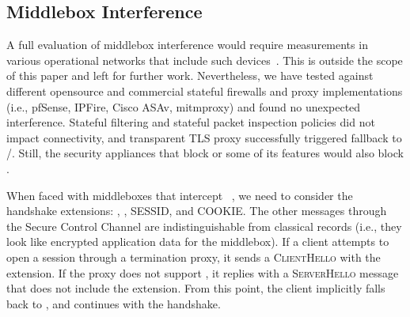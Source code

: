 

\subsection{Middlebox Interference}
\label{sec:middlebox}

A full evaluation of middlebox interference would require measurements in various operational networks that include such devices~\cite{honda2011still,raman2020measuring,o2016tls}. This is
outside the scope of this paper and left for further work. Nevertheless, we have tested \tcpls against different opensource and commercial stateful
firewalls and proxy implementations (i.e., pfSense, IPFire, Cisco ASAv,
mitmproxy) and found no unexpected interference. Stateful filtering and stateful
packet inspection policies did not impact connectivity, and transparent TLS proxy successfully triggered \tcpls fallback to \tls/\tcp. Still, the security
appliances that block  or some of its features
\cite{lee2019matls,Bock_China,raman2020measuring} would also block \tcpls.

When faced with middleboxes that intercept ~\cite{Bock_China,raman2020measuring}, we need to consider the \tcpls handshake \tls extensions: \tcpls, \join, SESSID, and COOKIE. The other
\tcpls messages through the Secure Control Channel are indistinguishable from
classical \tls records (i.e., they look like encrypted application data
for the middlebox). If a client attempts to open a \tcpls session
through a \tls termination proxy, it sends a \textsc{ClientHello} with the
\tcpls extension. If the proxy does not support \tcpls, it replies with a
\textsc{ServerHello} message that does not include the \tcpls extension. From
this point, the client implicitly falls back to \tls, and continues with the
handshake.

